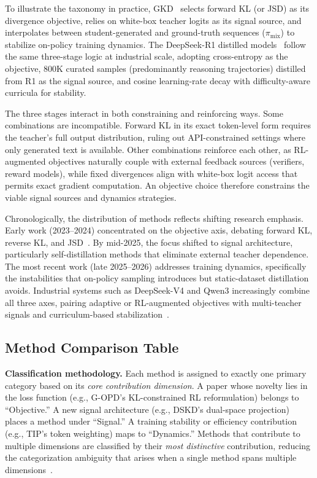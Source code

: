 \documentclass{article} %
\begin{document}
To illustrate the taxonomy in practice, GKD~\citep{2306.13649} selects forward KL (or JSD) as its divergence objective, relies on white-box teacher logits as its signal source, and interpolates between student-generated and ground-truth sequences ($\pi_{\mathrm{mix}}$) to stabilize on-policy training dynamics. The DeepSeek-R1 distilled models~\citep{2501.12948} follow the same three-stage logic at industrial scale, adopting cross-entropy as the objective, 800K curated samples (predominantly reasoning trajectories) distilled from R1 as the signal source, and cosine learning-rate decay with difficulty-aware curricula for stability.

The three stages interact in both constraining and reinforcing ways. Some combinations are incompatible. Forward KL in its exact token-level form requires the teacher's full output distribution, ruling out API-constrained settings where only generated text is available. Other combinations reinforce each other, as RL-augmented objectives naturally couple with external feedback sources (verifiers, reward models), while fixed divergences align with white-box logit access that permits exact gradient computation. An objective choice therefore constrains the viable signal sources and dynamics strategies.

Chronologically, the distribution of methods reflects shifting research emphasis. Early work (2023--2024) concentrated on the objective axis, debating forward KL, reverse KL, and JSD~\citep{2306.13649,2306.08543}. By mid-2025, the focus shifted to signal architecture, particularly self-distillation methods that eliminate external teacher dependence. The most recent work (late 2025--2026) addresses training dynamics, specifically the instabilities that on-policy sampling introduces but static-dataset distillation avoids. Industrial systems such as DeepSeek-V4 and Qwen3 increasingly combine all three axes, pairing adaptive or RL-augmented objectives with multi-teacher signals and curriculum-based stabilization~\citep{2602.12125,2505.09388}.

\subsection{Method Comparison Table}

\textbf{Classification methodology.} Each method is assigned to exactly one primary category based on its \emph{core contribution dimension}. A paper whose novelty lies in the loss function (e.g., G-OPD's KL-constrained RL reformulation) belongs to ``Objective.'' A new signal architecture (e.g., DSKD's dual-space projection) places a method under ``Signal.'' A training stability or efficiency contribution (e.g., TIP's token weighting) maps to ``Dynamics.'' Methods that contribute to multiple dimensions are classified by their \emph{most distinctive} contribution, reducing the categorization ambiguity that arises when a single method spans multiple dimensions~\citep{2402.13116}.
\end{document}
